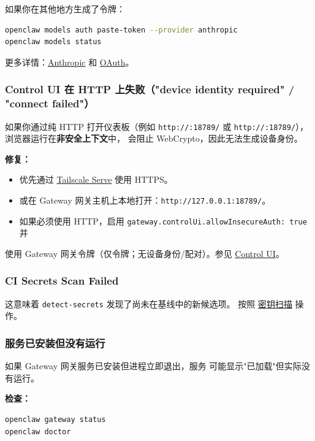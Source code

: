 如果你在其他地方生成了令牌：

\begin{lstlisting}[language=bash]
openclaw models auth paste-token --provider anthropic
openclaw models status
\end{lstlisting}


更多详情：\href{/providers/anthropic}{Anthropic} 和 \href{/concepts/oauth}{OAuth}。

\subsubsection{Control UI 在 HTTP 上失败（"device identity required" / "connect failed"）}


如果你通过纯 HTTP 打开仪表板（例如 \texttt{http://:18789/} 或
\texttt{http://:18789/}），浏览器运行在\textbf{非安全上下文}中，
会阻止 WebCrypto，因此无法生成设备身份。

\textbf{修复：}

\begin{itemize}
  \item 优先通过 \href{/gateway/tailscale}{Tailscale Serve} 使用 HTTPS。
  \item 或在 Gateway 网关主机上本地打开：\texttt{http://127.0.0.1:18789/}。
  \item 如果必须使用 HTTP，启用 \texttt{gateway.controlUi.allowInsecureAuth: true} 并
\end{itemize}

使用 Gateway 网关令牌（仅令牌；无设备身份/配对）。参见
\href{/web/control-ui\#insecure-http}{Control UI}。

\subsubsection{CI Secrets Scan Failed}


这意味着 \texttt{detect-secrets} 发现了尚未在基线中的新候选项。
按照 \href{/gateway/security\#secret-scanning-detect-secrets}{密钥扫描} 操作。

\subsubsection{服务已安装但没有运行}


如果 Gateway 网关服务已安装但进程立即退出，服务
可能显示"已加载"但实际没有运行。

\textbf{检查：}

\begin{lstlisting}[language=bash]
openclaw gateway status
openclaw doctor
\end{lstlisting}


